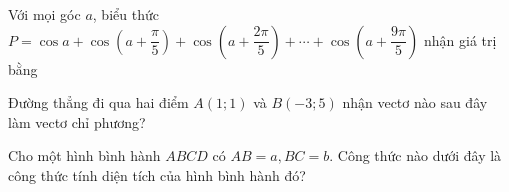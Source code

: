 \begin{ex}%
Với mọi góc $a$, biểu thức $P=\cos a + \cos \left( {a + \dfrac{\pi }{5}} \right) + \cos \left( {a + \dfrac{{2\pi }}{5}} \right) + \cdots + \cos \left( {a + \dfrac{{9\pi }}{5}} \right)$  nhận giá trị bằng
\end{ex}

\begin{ex}%
Đường thẳng đi qua hai điểm $A(1;1)$ và $B(-3;5)$ nhận vectơ nào sau đây làm vectơ chỉ phương?
\end{ex}

\begin{ex}%
Cho một hình bình hành $ABCD$ có $AB=a, BC=b$. Công thức nào dưới đây là công thức tính diện tích của hình bình hành đó?
\end{ex}


